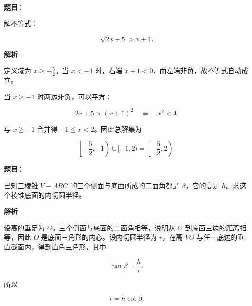\begin{answer}

\textbf{题目}：

解不等式：

\nopagebreak[4]
\[
\sqrt{2x+5}>x+1.
\]

\textbf{解析}

定义域为 $x\ge-\frac52$。当 $x<-1$ 时，右端 $x+1<0$，而左端非负，故不等式自动成立。

当 $x\ge-1$ 时两边非负，可以平方：

\nopagebreak[4]
\[
2x+5>(x+1)^2
\quad\Longleftrightarrow\quad
x^2<4.
\]

与 $x\ge-1$ 合并得 $-1\le x<2$。因此总解集为

\nopagebreak[4]
\[
\left[-\frac52,-1\right)\cup[-1,2)
=\left[-\frac52,2\right).
\]

\gkanswer{答案：$x\in\left[-\dfrac52,2\right)$}

\end{answer}
\begin{answer}

\textbf{题目}：

已知三棱锥 $V-ABC$ 的三个侧面与底面所成的二面角都是 $\beta$，它的高是 $h$。求这个棱锥底面的内切圆半径。

\textbf{解析}

设高的垂足为 $O$。三个侧面与底面的二面角相等，说明从 $O$ 到底面三边的距离相等，因此 $O$ 是底面三角形的内心。设内切圆半径为 $r$，在高 $VO$ 与任一底边的垂直截面内，得到直角三角形，其中

\nopagebreak[4]
\[
\tan\beta=\frac hr.
\]

所以

\nopagebreak[4]
\[
r=h\cot\beta.
\]


\end{answer}
